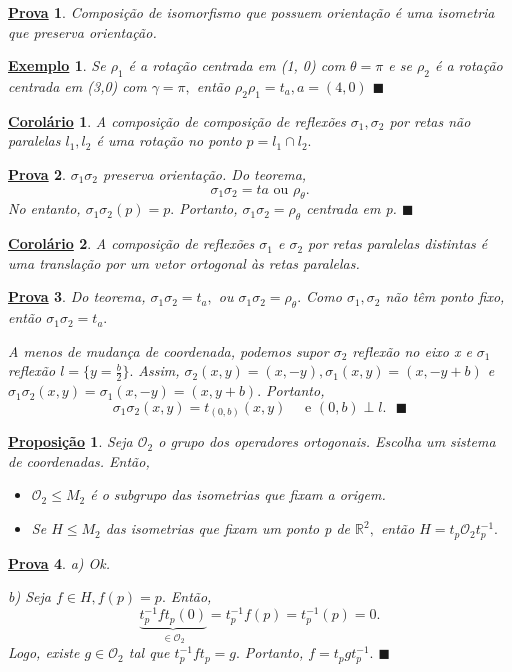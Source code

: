 \documentclass{article}
\newtheorem*{prop*}{\underline{Proposi\c c\~ao}}
\newtheorem*{crl*}{\underline{Corol\'ario}}
\newtheorem{example*}{\underline{Exemplo}}
\newtheorem*{proof*}{\underline{Prova}}
\renewcommand\qedsymbol{$\blacksquare$}
\begin{document}
\begin{proof*}
  Composição de isomorfismo que possuem orientação é uma isometria que preserva orientação.
\end{proof*}
\begin{example*}
  Se $\rho _{1}$ é a rotação centrada em (1, 0) com $\theta = \pi $ e se $\rho _{2}$ é a rotação centrada em (3,0) com
  $\gamma =\pi ,$ então $\rho _{2}\rho _{1}=t_{a}, a = (4, 0)$ \qedsymbol 
\end{example*}
\begin{crl*}
  A composição de composição de reflexões $\sigma _{1}, \sigma _{2}$ por retas não paralelas $l_{1}, l_{2}$ é uma rotação no ponto
  $p=l_{1}\cap l_{2}.$
\end{crl*}
\begin{proof*}
  $\sigma_{1}\sigma _{2}$ preserva orientação. Do teorema, 
    $$
    \sigma _{1}\sigma _{2} = ta\text{ ou } \rho _{\theta }.
    $$
  No entanto, $\sigma _{1}\sigma _{2}(p) = p.$ Portanto, $\sigma _{1}\sigma _{2} = \rho _{\theta }$ centrada em p. \qedsymbol
\end{proof*}
\begin{crl*}
  A composição de reflexões $\sigma _{1}$ e $\sigma _{2}$ por retas paralelas distintas é uma translação por um vetor ortogonal
  às retas paralelas.
\end{crl*}
\begin{proof*}
  Do teorema, $\sigma _{1}\sigma _{2} = t_{a},$ ou $\sigma _{1}\sigma _{2} = \rho _{\theta }.$ Como $\sigma _{1}, \sigma _{2}$
  não têm ponto fixo, então $\sigma _{1}\sigma _{2} = t_{a}.$

  A menos de mudança de coordenada, podemos supor $\sigma _{2}$ reflexão no eixo x e $\sigma _{1}$ reflexão $l=\{y=\frac{b}{2}\}.$ Assim,
  $\sigma _{2}(x, y) = (x, -y), \sigma _{1}(x,y) = (x, -y+b)$ e $\sigma _{1}\sigma _{2}(x, y)=\sigma _{1}(x, -y) = (x, y+b).$ Portanto,
    $$
    \sigma _{1}\sigma _{2}(x,y) = t_{(0, b)}(x,y)\quad\text{ e }(0,b)\perp l.\text{ \qedsymbol}
    $$
\end{proof*}
\begin{prop*}
  Seja $\mathcal{O}_{2}$ o grupo dos operadores ortogonais. Escolha um sistema de coordenadas. Então, 
 \begin{itemize}
   \item[a)] $\mathcal{O}_{2}\leq M_{2}$ é o subgrupo das isometrias que fixam a origem.
     \item[b)] Se $H\leq M_{2}$ das isometrias que fixam um ponto p de $\mathbb{R}^{2},$ então $H = t_{p}\mathcal{O}_{2}t_{p}^{-1}.$
 \end{itemize}
\end{prop*}
\begin{proof*}
  a) Ok.

  b) Seja $f\in H, f(p) = p.$ Então, 
    $$
    \underbrace{t_{p}^{-1}ft_{p}(0)}_{\in \mathcal{O}_{2}} = t_{p}^{-1}f(p) = t_{p}^{-1}(p) = 0.
    $$
    Logo, existe $g\in \mathcal{O}_{2}$ tal que $t_{p}^{-1}ft_{p} = g.$ Portanto, $f = t_{p}gt_{p}^{-1}.$ \qedsymbol
\end{proof*}
\end{document}
